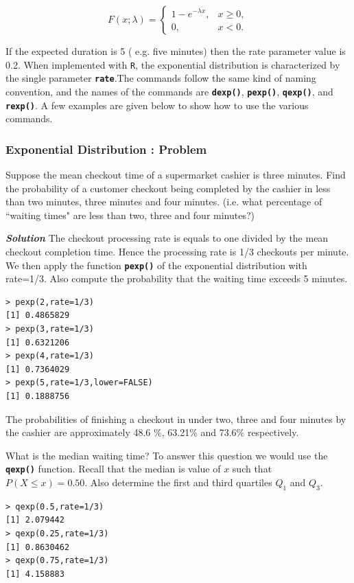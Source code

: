\documentclass[a4paper,12pt]{article}
\begin{document}
\[
F(x;\lambda) = \begin{cases}
1-e^{-\lambda x}, & x \ge 0, \\
0, & x < 0.
\end{cases}\]

If the expected duration is 5 ( e.g. five minutes) then the rate parameter value is 0.2. When implemented with \texttt{R}, the exponential distribution is characterized by the single parameter \texttt{\textbf{rate}}.The commands follow the same kind of naming convention, and the names of the commands are \texttt{\textbf{dexp()}}, \texttt{\textbf{pexp()}}, \texttt{\textbf{qexp()}}, and \texttt{\textbf{rexp()}}. A few examples are given below to show how to use the various commands. 

\subsubsection{Exponential Distribution : Problem}
Suppose the mean checkout time of a supermarket cashier is three minutes. Find the probability of a customer checkout being completed by the cashier in less than two minutes, three minutes and four minutes. 
(i.e. what percentage of ``waiting times" are less than two, three and four minutes?)

\textbf{\emph{Solution}} The checkout processing rate is equals to one divided by the mean checkout completion time. 
Hence the processing rate is 1/3 checkouts per minute. We then apply the function \texttt{\textbf{pexp()}} of the exponential distribution with rate=1/3. 
Also compute the probability that the waiting time exceeds 5 minutes.
\begin{verbatim}
> pexp(2,rate=1/3)
[1] 0.4865829
> pexp(3,rate=1/3)
[1] 0.6321206
> pexp(4,rate=1/3)
[1] 0.7364029
> pexp(5,rate=1/3,lower=FALSE)
[1] 0.1888756
\end{verbatim}
The probabilities of finishing a checkout in under two, three and four minutes by the cashier are approximately 48.6 \%, 63.21\% and 73.6\% respectively. 

What is the median waiting time? To answer this question we would use the \texttt{\textbf{qexp()}} function. Recall that the median is value of $x$ such that $P(X \leq x) = 0.50$.
Also determine the first and third quartiles $Q_1$ and $Q_3$.
\begin{verbatim}
> qexp(0.5,rate=1/3)
[1] 2.079442
> qexp(0.25,rate=1/3)
[1] 0.8630462
> qexp(0.75,rate=1/3)
[1] 4.158883
\end{verbatim}
\newpage
\end{document}
